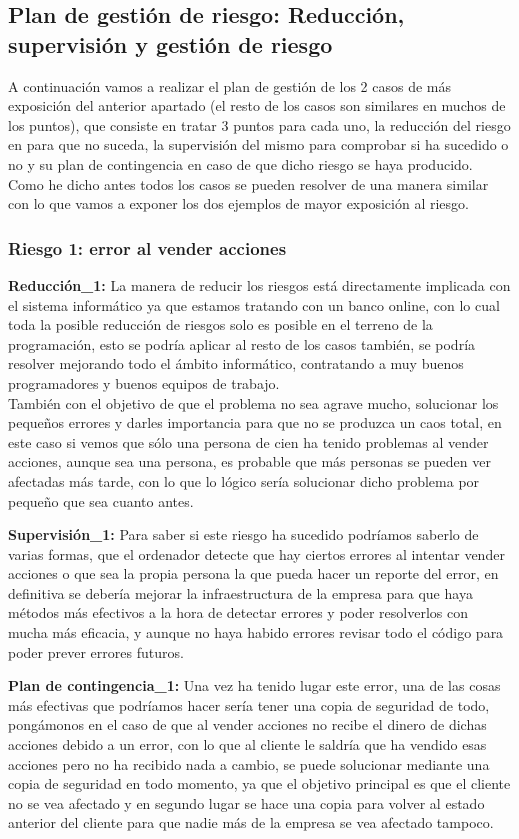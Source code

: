 \subsection{Plan de gestión de riesgo: Reducción, supervisión y gestión de riesgo}
A continuación vamos a realizar el plan de gestión de los 2 casos de más exposición del anterior apartado (el resto de los casos son similares en muchos de los puntos), que consiste en tratar 3 puntos para cada uno, la reducción del riesgo en para que no suceda, la supervisión del mismo para comprobar si ha sucedido o no y su plan de contingencia en caso de que dicho riesgo se haya producido.\\
Como he dicho antes todos los casos se pueden resolver de una manera similar con lo que vamos a exponer los dos ejemplos de mayor exposición al riesgo.
\subsubsection{Riesgo 1: error al vender acciones}
\textbf{Reducción\_1:} La manera de reducir los riesgos está directamente implicada con el sistema informático ya que estamos tratando con un banco online, con lo cual toda la posible reducción de riesgos solo es posible en el terreno de la programación, esto se podría aplicar al resto de los casos también, se podría resolver mejorando todo el ámbito informático, contratando a muy buenos programadores y buenos equipos de trabajo.\\
También con el objetivo de que el problema no sea agrave mucho, solucionar los pequeños errores y darles importancia para que no se produzca un caos total, en este caso si vemos que sólo una persona de cien ha tenido problemas al vender acciones, aunque sea una persona, es probable que más personas se pueden ver afectadas más tarde, con lo que lo lógico sería solucionar dicho problema por pequeño que sea cuanto antes.

\textbf{Supervisión\_1:} Para saber si este riesgo ha sucedido podríamos saberlo de varias formas, que el ordenador detecte que hay ciertos errores al intentar vender acciones o que sea la propia persona la que pueda hacer un reporte del error, en definitiva se debería mejorar la infraestructura de la empresa para que haya métodos más efectivos a la hora de detectar errores y poder resolverlos con mucha más eficacia, y aunque no haya habido errores revisar todo el código para poder prever errores futuros.

\textbf{Plan de contingencia\_1:} Una vez ha tenido lugar este error, una de las cosas más efectivas que podríamos hacer sería tener una copia de seguridad de todo, pongámonos en el caso de que al vender acciones no recibe el dinero de dichas acciones debido a un error, con lo que al cliente le saldría que ha vendido esas acciones pero no ha recibido nada a cambio, se puede solucionar mediante una copia de seguridad en todo momento, ya que el objetivo principal es que el cliente no se vea afectado y en segundo lugar se hace una copia para volver al estado anterior del cliente para que nadie más de la empresa se vea afectado tampoco.


